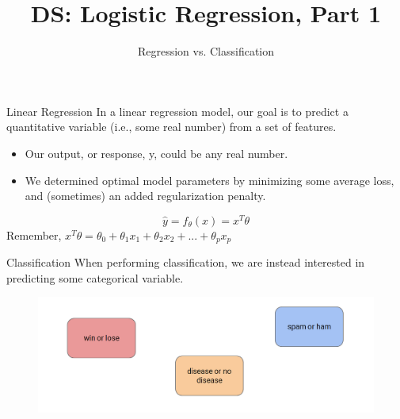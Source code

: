 \documentclass[aspectratio=169]{../latex_main/tntbeamer}  %
\title[Introduction]{DS: Logistic Regression, Part 1}
\subtitle{Regression vs. Classification}
\begin{document}
	
	\maketitle
	\begin{frame}{Linear Regression}
	    In a linear regression model, our goal is to predict a quantitative variable (i.e., some real number) from a set of features.
	    \begin{itemize}
	        \item Our output, or response, y, could be any real number.
	        \item We determined optimal model parameters by minimizing some average loss, and (sometimes) an added regularization penalty.
	    \end{itemize}
	    \begin{equation*}
	        \hat{y} = f_\theta (x) = x^T\theta
	    \end{equation*}
	    Remember, $x^T\theta = \theta_0 + \theta_1x_1 + \theta_2x_2 + ... + \theta_px_p$ 
	\end{frame}
	
	
	\begin{frame}{Classification}
	    When performing classification, we are instead interested in predicting some categorical variable.
	    \begin{figure}
	        \centering
	        \includegraphics[scale=.35]{Bild1}
	    \end{figure}
	\end{frame}
	
\end{document}
